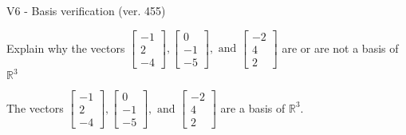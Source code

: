 \begin{exercise}
  \begin{exerciseTitle}V6 - Basis verification (ver. 455)\end{exerciseTitle}
  \begin{exerciseStatement}
    Explain why the vectors \(\left[\begin{array}{r}
-1 \\
2 \\
-4
\end{array}\right] , \left[\begin{array}{r}
0 \\
-1 \\
-5
\end{array}\right] , \text{ and } \left[\begin{array}{r}
-2 \\
4 \\
2
\end{array}\right]\) are or are not a basis of \(\mathbb{R}^3\)	


  \end{exerciseStatement}
  \begin{exerciseAnswer}
   The vectors \(\left[\begin{array}{r}
-1 \\
2 \\
-4
\end{array}\right] , \left[\begin{array}{r}
0 \\
-1 \\
-5
\end{array}\right] , \text{ and } \left[\begin{array}{r}
-2 \\
4 \\
2
\end{array}\right]\) 
  	 are  a basis of \(\mathbb{R}^3\).
  


  \end{exerciseAnswer}
\end{exercise}
